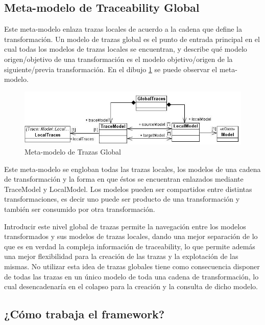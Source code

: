 \documentclass[a4paper,12pt,oneside,spanish]{book}
\begin{document}
\subsection{Meta-modelo de Traceability Global}

Este meta-modelo enlaza trazas locales de acuerdo a la cadena que define la transformación. Un modelo de trazas global es el punto de entrada principal en el cual todas los modelos de trazas locales se encuentran, y describe qué modelo origen/objetivo de una transformación es el modelo objetivo/origen de la siguiente/previa transformación. En el dibujo \ref{fig:GlobalTraceMetamodel} se puede observar el meta-modelo.

\begin{figure}[hbtp]
\centering
\includegraphics[scale=.6]{./img/GlobalTraceMetamodel}
\caption{Meta-modelo de Trazas Global}
\label{fig:GlobalTraceMetamodel}
\end{figure}

Este meta-modelo se engloban todas las trazas locales, los modelos de una cadena de transformación y la forma en que éstos se encuentran enlazados mediante TraceModel y LocalModel. Los modelos pueden ser compartidos entre distintas transformaciones, es decir uno puede ser producto de una transformación y también ser consumido por otra transformación.

Introducir este nivel global de trazas permite la navegación entre los modelos transformados y sus modelos de trazas locales, dando una mejor separación de lo que es en verdad la compleja información de traceability, lo que permite además una mejor flexibilidad para la creación de las trazas y la explotación de las mismas. No utilizar esta idea de trazas globales tiene como consecuencia disponer de todas las trazas en un único modelo de toda una cadena de transformación, lo cual desencadenaría en el colapso para la creación y la consulta de dicho modelo.

\subsection{¿Cómo trabaja el framework?}
\end{document}
